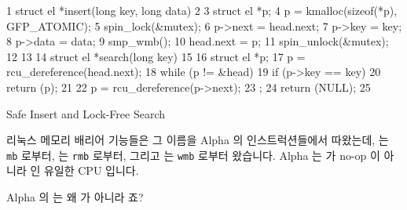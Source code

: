\begin{listing}[tbp]
{ \scriptsize
\begin{verbbox}
 1  struct el *insert(long key, long data)
 2  {
 3      struct el *p;
 4      p = kmalloc(sizeof(*p), GFP_ATOMIC);
 5      spin_lock(&mutex);
 6      p->next = head.next;
 7      p->key = key;
 8      p->data = data;
 9      smp_wmb();
10      head.next = p;
11      spin_unlock(&mutex);
12  }
13
14  struct el *search(long key)
15  {
16      struct el *p;
17      p = rcu_dereference(head.next);
18      while (p != &head) {
19          if (p->key == key) {
20              return (p);
21          }
22          p = rcu_dereference(p->next);
23      };
24      return (NULL);
25  }
\end{verbbox}
}
\centering
\theverbbox
\caption{Safe Insert and Lock-Free Search}
\label{lst:memorder:Safe Insert and Lock-Free Search}
\end{listing}

리눅스 메모리 배리어 기능들은 그 이름을 Alpha 의 인스트럭션들에서 따왔는데,
 는 {\tt mb} 로부터,  는 {\tt rmb} 로부터, 그리고
 는 {\tt wmb} 로부터 왔습니다.
Alpha 는  가 no-op 이 아니라  인
유일한 CPU 입니다.

\QuickQuiz{}
	Alpha 의  는 왜  가 아니라
	 죠?
	\iffalse

